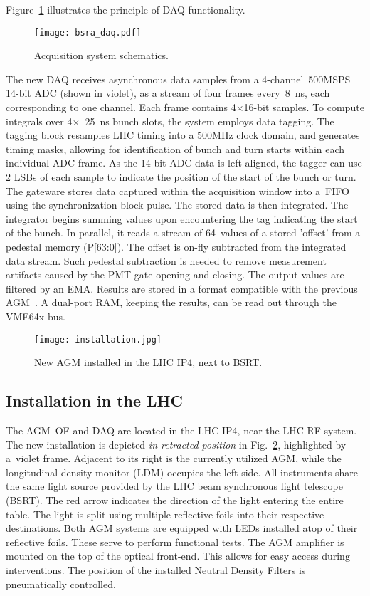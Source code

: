 Figure~\ref{fig:bsra_daq}
illustrates the principle of DAQ functionality.
\begin{figure}[!tbh]
    \centering
    \texttt{[image: bsra\_daq.pdf]}
    \caption{Acquisition system schematics.}
    \label{fig:bsra_daq}
\end{figure}
The new DAQ receives asynchronous data samples from a 4-channel~500MSPS 14-bit ADC
(shown in violet), as a stream of four frames
every~\SI{8}{\nano s}, each corresponding to one channel. Each frame contains 4$\times$16-bit samples. To compute integrals over 4$\times$~\SI{25}{\nano\second} bunch slots, the system
employs data tagging. The tagging block resamples LHC timing into a 500MHz clock domain, and
generates timing masks, allowing for identification of bunch and turn starts within each individual ADC frame. As the 14-bit ADC data is left-aligned, the tagger can use 2 LSBs of each sample to indicate the position of the start of the bunch or turn.\\
The gateware stores data captured within the acquisition window into a~FIFO using the
synchronization block pulse. The stored data is then integrated. The integrator begins summing values upon
encountering the tag indicating the start of the bunch. In parallel, it reads a stream of 64~values of a stored 'offset' from a pedestal memory (P[63:0]). The offset is on-fly subtracted from the integrated data stream. Such pedestal subtraction is needed to remove measurement artifacts caused by the PMT gate opening and closing. The output values are filtered by an EMA. Results are stored in a format compatible with the previous AGM~\cite{my_thesis}. A dual-port RAM, keeping the results, can be read out through the VME64x bus.

\begin{figure}[!tbh]
    \centering
    \texttt{[image: installation.jpg]}
    \caption{New AGM installed in the LHC IP4, next to BSRT.}
    \label{fig:installation}
\end{figure}

\subsection{Installation in the LHC}

The AGM~OF and DAQ are located in the LHC IP4, near the LHC RF system. The
new installation is depicted \textit{in retracted position} in Fig.~\ref{fig:installation}, highlighted by a~violet frame. Adjacent to its right is the currently utilized AGM, while
the longitudinal density monitor (LDM) occupies the left side. All instruments share the same light source
provided by the LHC beam synchronous light telescope (BSRT). The red
arrow indicates the direction of the light entering the entire table.
The light is split using multiple reflective foils into their respective destinations. Both AGM systems are equipped with LEDs installed atop of their reflective foils. These serve to perform functional tests.
The
AGM amplifier is mounted on the top of the optical front-end. This allows for easy access during interventions. The position of the installed Neutral Density Filters is pneumatically controlled.

